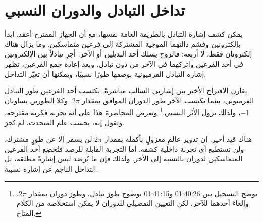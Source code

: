 \section{تداخل التبادل والدوران النسبي}

يمكن كشف إشارة التبادل بالطريقة العامة نفسها، مع أن الجهاز المقترح أعقد. ابدأ بإلكترونين وقسّم دالتهما الموجية المشتركة إلى فرعين متماسكين. وما يزال هناك إلكترونان فقط، لا أربعة: فالزوج يسلك أحد البديلين أو الآخر. أجرِ تبادلاً بين الإلكترونين في أحد الفرعين واتركهما في الآخر من دون تبادل. وبعد إعادة جمع الفرعين، تظهر إشارة التبادل الفرميونية بوصفها طورًا نسبيًا، ويمكنها أن تغيّر التداخل.

يقارن الاقتراح الأخير بين إشارتي السالب مباشرةً. يكتسب أحد الفرعين طور التبادل الفرميوني، بينما يكتسب الآخر طور الدوران الموافق بمقدار \(2\pi\). وكلا الطورين يساويان \(-1\)، ولذلك يزول الأثر النسبي.\footnote{يوضح التسجيل بين 01:40:26 و01:41:15 بوضوح طورَ تبادل، وطورَ دوران بمقدار \(2\pi\)، وإلغاءَ أحدهما للآخر، لكن التعيين التفصيلي للدوران لا يمكن استخلاصه من الكلام المتاح.} وتعرض المحاضرة هذا على أنه تجربة فكرية مقترحة، وتقول إنه، بحسب علم المتحدث، لم تُجرَ.

\begin{classroomqa}
\end{classroomqa}

هناك قيد أخير. إن تدوير عالمٍ معزولٍ بأكمله بمقدار \(2\pi\) لن يسفر إلا عن طورٍ مشترك، ولن تستطيع أي تجربة داخلية كشفه. أما التجربة القابلة للرصد فتُخضِع أحد الفرعين المتماسكين لدوران بالنسبة إلى الآخر. ولذلك فإن ما يُرصَد ليس إشارةً مطلقة، بل التداخل الناجم عن إشارة نسبية.
